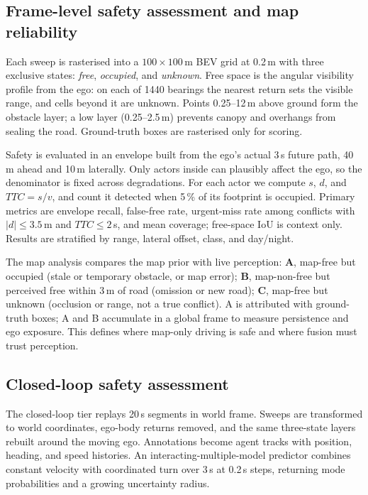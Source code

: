 \documentclass[10pt,a4paper]{article}
\begin{document}
\subsection{Frame-level safety assessment and map reliability}

Each sweep is rasterised into a $100\times100$\,m BEV grid at 0.2\,m with three exclusive states: \emph{free}, \emph{occupied}, and \emph{unknown}. Free space is the angular visibility profile from the ego: on each of 1440 bearings the nearest return sets the visible range, and cells beyond it are unknown. Points 0.25--12\,m above ground form the obstacle layer; a low layer (0.25--2.5\,m) prevents canopy and overhangs from sealing the road. Ground-truth boxes are rasterised only for scoring.

Safety is evaluated in an envelope built from the ego's actual 3\,s future path, 40\,m ahead and 10\,m laterally. Only actors inside can plausibly affect the ego, so the denominator is fixed across degradations. For each actor we compute $s$, $d$, and $TTC=s/v$, and count it detected when 5\,\% of its footprint is occupied. Primary metrics are envelope recall, false-free rate, urgent-miss rate among conflicts with $|d|\le3.5$\,m and $TTC\le2$\,s, and mean coverage; free-space IoU is context only. Results are stratified by range, lateral offset, class, and day/night.

The map analysis compares the map prior with live perception: \textbf{A}, map-free but occupied (stale or temporary obstacle, or map error); \textbf{B}, map-non-free but perceived free within 3\,m of road (omission or new road); \textbf{C}, map-free but unknown (occlusion or range, not a true conflict). A is attributed with ground-truth boxes; A and B accumulate in a global frame to measure persistence and ego exposure. This defines where map-only driving is safe and where fusion must trust perception.

\subsection{Closed-loop safety assessment}

The closed-loop tier replays 20\,s segments in world frame. Sweeps are transformed to world coordinates, ego-body returns removed, and the same three-state layers rebuilt around the moving ego. Annotations become agent tracks with position, heading, and speed histories. An interacting-multiple-model predictor combines constant velocity with coordinated turn over 3\,s at 0.2\,s steps, returning mode probabilities and a growing uncertainty radius.
\end{document}
